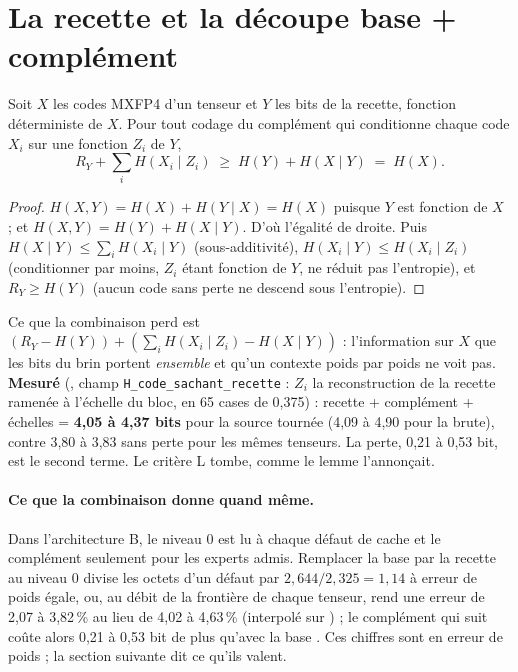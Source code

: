 \section{La recette et la découpe base + complément}\label{t3gen:sec:complement}

\begin{lemme}\label{t3gen:lem:complement}
Soit $X$ les codes MXFP4 d'un tenseur et $Y$ les bits de la recette, fonction déterministe de $X$. Pour tout codage du complément qui conditionne chaque code $X_i$ sur une fonction $Z_i$ de $Y$,
\begin{equation}\label{t3gen:eq:complement}
R_Y + \sum_i H(X_i \mid Z_i) \;\ge\; H(Y) + H(X \mid Y) \;=\; H(X).
\end{equation}
\end{lemme}

\begin{proof}
$H(X, Y) = H(X) + H(Y \mid X) = H(X)$ puisque $Y$ est fonction de $X$ ; et $H(X, Y) = H(Y) + H(X \mid Y)$. D'où l'égalité de droite. Puis $H(X \mid Y) \le \sum_i H(X_i \mid Y)$ (sous-additivité), $H(X_i \mid Y) \le H(X_i \mid Z_i)$ (conditionner par moins, $Z_i$ étant fonction de $Y$, ne réduit pas l'entropie), et $R_Y \ge H(Y)$ (aucun code sans perte ne descend sous l'entropie).
\end{proof}

Ce que la combinaison perd est $(R_Y - H(Y)) + (\sum_i H(X_i\mid Z_i) - H(X\mid Y))$ : l'information sur $X$ que les bits du brin portent \emph{ensemble} et qu'un contexte poids par poids ne voit pas. \textbf{Mesuré} (, champ \texttt{H\_code\_sachant\_recette} : $Z_i$ la reconstruction de la recette ramenée à l'échelle du bloc, en 65 cases de 0,375) : recette + complément + échelles = \textbf{4,05 à 4,37 bits} pour la source tournée (4,09 à 4,90 pour la brute), contre 3,80 à 3,83 sans perte pour les mêmes tenseurs. La perte, 0,21 à 0,53 bit, est le second terme. Le critère L tombe, comme le lemme l'annonçait.

\paragraph{Ce que la combinaison donne quand même.} Dans l'architecture B, le niveau 0 est lu à chaque défaut de cache et le complément seulement pour les experts admis. Remplacer la base par la recette au niveau 0 divise les octets d'un défaut par $2{,}644/2{,}325 = 1{,}14$ à erreur de poids égale, ou, au débit de la frontière de chaque tenseur, rend une erreur de 2,07 à 3,82\,\% au lieu de 4,02 à 4,63\,\% (interpolé sur ) ; le complément qui suit coûte alors 0,21 à 0,53 bit de plus qu'avec la base \calc. Ces chiffres sont en erreur de poids ; la section suivante dit ce qu'ils valent.

